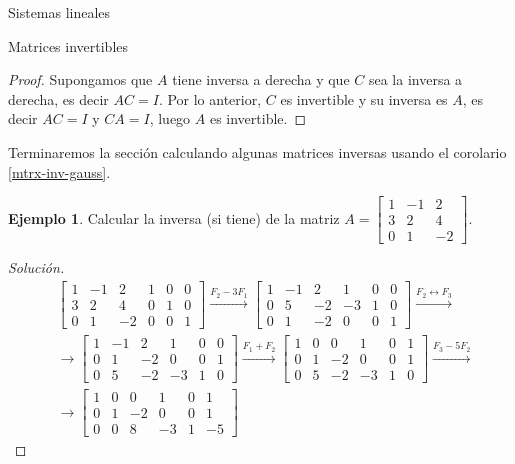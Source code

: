 \documentclass[a4paper,12pt,twoside,spanish]{amsbook}
\theoremstyle{definition}
\newtheorem{ejemplo}{Ejemplo}[section]
\theoremstyle{remark}
\begin{document}
\begin{chapter}{Sistemas lineales}
\begin{section}{Matrices invertibles}
\begin{proof}
				Supongamos que  $A$ tiene inversa a derecha y  que $C$ sea la inversa a derecha, es decir $AC=I$. Por lo anterior, $C$ es invertible y  su inversa es $A$, es decir $AC=I$ y $CA=I$, luego $A$  es invertible. 
			\end{proof}	
			
			
			
			Terminaremos la  sección calculando algunas matrices inversas usando el corolario  \ref{mtrx-inv-gauss}. 
			
			\begin{ejemplo}
				Calcular la inversa (si tiene) de la matriz $A=\begin{bmatrix}
				1&-1&2\\ 3&2&4\\ 0&1&-2
				\end{bmatrix}$. 
			\end{ejemplo}
			\begin{proof}[Solución]
				\begin{align*} 
				&\left[\begin{array}{rrr|rrr}	1&-1&2&1&0&0\\ 3&2&4&0&1&0\\ 0&1&-2&0&0&1 \end{array}\right]
				\stackrel{F_2-3 F_1}{\longrightarrow}
				\left[\begin{array}{rrr|rrr}	1&-1&2
				&1&0&0\\ 0&5&-2&-3&1&0\\ 0&1&-2&0&0&1 \end{array}\right]
				\stackrel{F_2\leftrightarrow F_3}{\longrightarrow} \\
				&\longrightarrow 
				\left[\begin{array}{rrr|rrr}	1&-1&2&1&0&0\\ 0&1&-2&0&0&1 \\ 0&5&-2&-3&1&0 \end{array}\right]
				\stackrel{F_1 + F_2}{\longrightarrow}
				\left[\begin{array}{rrr|rrr}	1&0&0&1&0&1\\ 0&1&-2&0&0&1 \\ 0&5&-2&-3&1&0 \end{array}\right]
				\stackrel{F_3-5F_2}{\longrightarrow} \\
				&\longrightarrow
				\left[\begin{array}{rrr|rrr}	1&0&0&1&0&1\\ 0&1&-2&0&0&1 \\ 0&0&8&-3&1&-5 \end{array}\right]

\end{align*}
\end{proof}
\end{section}
\end{chapter}
\end{document}
